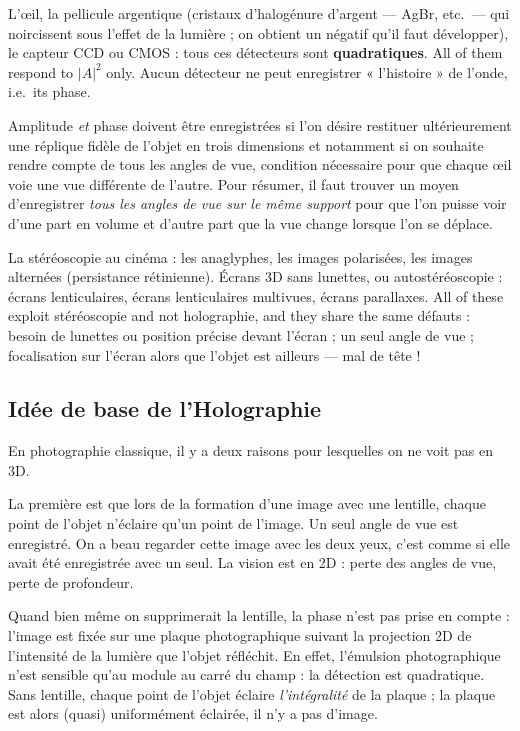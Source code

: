 \begin{remark}
  L'œil, la pellicule argentique (cristaux d'halogénure d'argent --- AgBr, etc.\
  --- qui noircissent sous l'effet de la lumière ; on obtient un négatif qu'il
  faut développer), le capteur CCD ou CMOS : tous ces détecteurs sont
  \textbf{quadratiques}. All of them respond to $|A|^2$ only. Aucun détecteur ne
  peut enregistrer « l'histoire » de l'onde, i.e.\ its phase.
\end{remark}

\begin{conclusion}
  Amplitude \emph{et} phase doivent être enregistrées si l'on désire restituer
  ultérieurement une réplique fidèle de l'objet en trois dimensions et notamment
  si on souhaite rendre compte de tous les angles de vue, condition nécessaire
  pour que chaque œil voie une vue différente de l'autre. Pour résumer, il faut
  trouver un moyen d'enregistrer \emph{tous les angles de vue sur le même
  support} pour que l'on puisse voir d'une part en volume et d'autre part que la
  vue change lorsque l'on se déplace.
\end{conclusion}

\begin{remark}
  La stéréoscopie au cinéma : les anaglyphes, les images polarisées, les images
  alternées (persistance rétinienne). Écrans 3D sans lunettes, ou
  autostéréoscopie : écrans lenticulaires, écrans lenticulaires multivues,
  écrans parallaxes. All of these exploit stéréoscopie and not holographie, and
  they share the same défauts : besoin de lunettes ou position précise devant
  l'écran ; un seul angle de vue ; focalisation sur l'écran alors que l'objet
  est ailleurs --- mal de tête !
\end{remark}

\subsection{Idée de base de l'Holographie}
En photographie classique, il y a deux raisons pour lesquelles on ne voit pas en
3D.

\begin{subpart}
  \item La première est que lors de la formation d'une image avec une lentille,
    chaque point de l'objet n'éclaire qu'un point de l'image. Un seul angle de
    vue est enregistré. On a beau regarder cette image avec les deux yeux, c'est
    comme si elle avait été enregistrée avec un seul. La vision est en 2D : perte
    des angles de vue, perte de profondeur.
  \item Quand bien même on supprimerait la lentille, la phase n'est pas prise en
    compte : l'image est fixée sur une plaque photographique suivant la
    projection 2D de l'intensité de la lumière que l'objet réfléchit. En effet,
    l'émulsion photographique n'est sensible qu'au module au carré du champ : la
    détection est quadratique. Sans lentille, chaque point de l'objet éclaire
    \emph{l'intégralité} de la plaque ; la plaque est alors (quasi) uniformément
    éclairée, il n'y a pas d'image.
\end{subpart}

